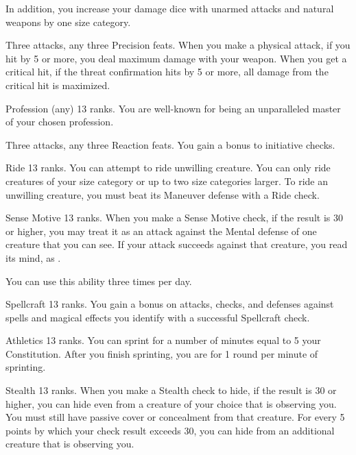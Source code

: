 In addition, you increase your damage dice with unarmed attacks and natural weapons by one size category.

\featpres Three attacks, any three Precision feats.
\featben When you make a physical attack, if you hit by 5 or more, you deal maximum damage with your weapon.
When you get a critical hit, if the threat confirmation hits by 5 or more, all damage from the critical hit is maximized.

\featpre Profession (any) 13 ranks.
\featben You are well-known for being an unparalleled master of your chosen profession.

\featpres Three attacks, any three Reaction feats.
\featben You gain a  bonus to initiative checks.

\featpre Ride 13 ranks.
\featben You can attempt to ride unwilling creature.
You can only ride creatures of your size category or up to two size categories larger.
To ride an unwilling creature, you must beat its Maneuver defense with a Ride check.

\featpre Sense Motive 13 ranks.
\featben When you make a Sense Motive check, if the result is 30 or higher, you may treat it as an attack against the Mental defense of one creature that you can see.
If your attack succeeds against that creature, you read its mind, as .

You can use this ability three times per day.

\featpre Spellcraft 13 ranks.
\featben You gain a  bonus on attacks, checks, and defenses against spells and magical effects you identify with a successful Spellcraft check.

\featpre Athletics 13 ranks.
\featben You can sprint for a number of minutes equal to 5 \add your Constitution.
After you finish sprinting, you are \fatigued for 1 round per minute of sprinting.

\featpre Stealth 13 ranks.
\featben When you make a Stealth check to hide, if the result is 30 or higher, you can hide even from a creature of your choice that is observing you.
You must still have passive cover or concealment from that creature.
For every 5 points by which your check result exceeds 30, you can hide from an additional creature that is observing you.

